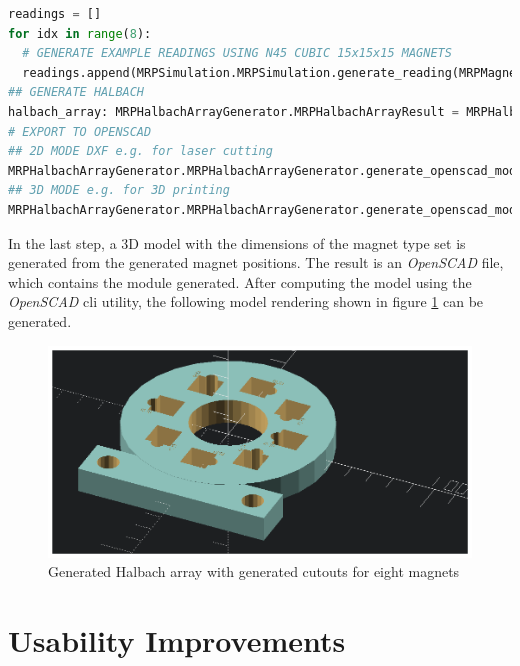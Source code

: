 \begin{lstlisting}[language=Python, caption={MRPHalbachArrayGenerator example for generating an OpenSCAD based Halbach ring}, label=lst:mrpexample_halbach]
readings = []
for idx in range(8):
  # GENERATE EXAMPLE READINGS USING N45 CUBIC 15x15x15 MAGNETS
  readings.append(MRPSimulation.MRPSimulation.generate_reading(MRPMagnetTypes.MagnetType.N45_CUBIC_15x15x15))
## GENERATE HALBACH
halbach_array: MRPHalbachArrayGenerator.MRPHalbachArrayResult = MRPHalbachArrayGenerator.MRPHalbachArrayGenerator.generate_1k_halbach_using_polarisation_direction(readings)
# EXPORT TO OPENSCAD
## 2D MODE DXF e.g. for laser cutting
MRPHalbachArrayGenerator.MRPHalbachArrayGenerator.generate_openscad_model([halbach_array], "./2d_test.scad",_2d_object_code=True)
## 3D MODE e.g. for 3D printing
MRPHalbachArrayGenerator.MRPHalbachArrayGenerator.generate_openscad_model([halbach_array], "./3d_test.scad",_2d_object_code=False)
\end{lstlisting}

In the last step, a 3D model with the dimensions of the magnet type set
is generated from the generated magnet positions. The result is an
\emph{OpenSCAD}  file, which contains the module
generated. After computing the model using the \emph{OpenSCAD} \gls{cli}
utility, the following model rendering shown in figure
\ref{Generated_Halbach_array_with_generated_cutouts_for_eight_magnets.png}
can be generated.

\begin{figure}
\centering
\includegraphics{./generated_images/border_Generated_Halbach_array_with_generated_cutouts_for_eight_magnets.png}
\caption{Generated Halbach array with generated cutouts for eight
magnets
\label{Generated_Halbach_array_with_generated_cutouts_for_eight_magnets.png}}
\end{figure}

\hypertarget{usability-improvements}{%
\chapter{Usability Improvements}\label{usability-improvements}}

